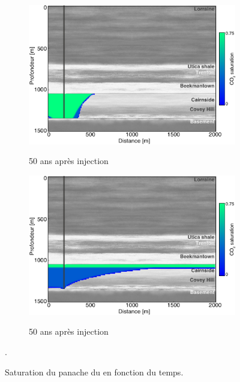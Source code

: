 \begin{figure}[p]
        \begin{subfigure}[b]{.47\textwidth}
                \caption{50 ans après injection }
                \includegraphics[width=\textwidth]{fig/50r.pdf}
                \label{fig:50r}
        \end{subfigure}
        \qquad
         \begin{subfigure}[b]{.47\textwidth}
                \caption{50 ans après injection}
                \includegraphics[width=\textwidth]{fig/50o.pdf}
                \label{fig:50o}
        \end{subfigure}

        \caption{Saturation du panache du  en fonction du temps.}
        \label{fig:co2_sat}.
\end{figure}
